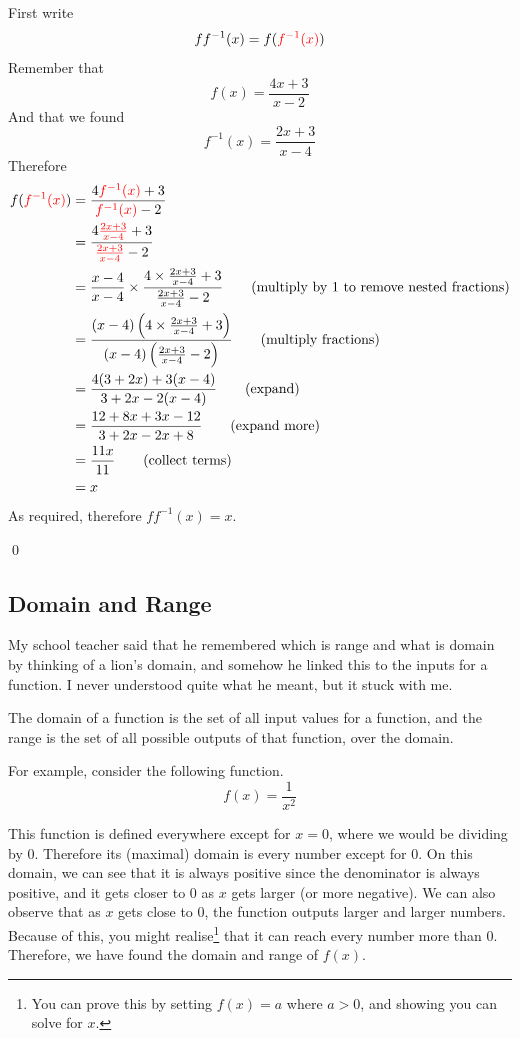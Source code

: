 \begin{solution}
\begin{enumerate}
        First write 
        \[ ff^{-1}(x) =  f(\textcolor{red}{f^{-1}(x)})\]
        Remember that 
        \[ f(x) = \frac{4x + 3}{x-2} \]
        And that we found 
        \[ f^{-1}(x) = \frac{2x+3}{x-4}\]
        Therefore 
        \begin{align*}
            f(\textcolor{red}{f^{-1}(x)}) &= \frac{4\textcolor{red}{f^{-1}(x)} + 3 }{\textcolor{red}{f^{-1}(x)} - 2} \\
                &= \frac{4\textcolor{red}{\frac{2x+3}{x-4}} + 3 }{\textcolor{red}{\frac{2x+3}{x-4}} - 2} \\ 
                &= \frac{x-4}{x-4} \times \frac{4\times \frac{2x+3}{x-4} + 3 }{\frac{2x+3}{x-4} - 2} \tag{multiply by $1$ to remove nested fractions} \\
                &= \frac{(x-4)\left(4\times \frac{2x+3}{x-4} + 3 \right)}{(x-4 )\left(\frac{2x+3}{x-4} - 2\right)} \tag{multiply fractions} \\
                &= \frac{4(3 + 2x) + 3(x-4)}{3+2x - 2(x-4)} \tag{expand} \\
                &= \frac{12 + 8x + 3x - 12}{3 + 2x - 2x + 8} \tag{expand more} \\
                &= \frac{11x}{11} \tag{collect terms}\\
                &= x
        \end{align*}
        As required, therefore $ff^{-1}(x) = x$.
    \end{enumerate}
    \qed
\end{solution}



\subsection{Domain and Range}

My school teacher said that he remembered which is range and what is domain by thinking of a lion's domain, and somehow he linked this to the inputs for a function. 
I never understood quite what he meant, but it stuck with me.

The domain of a function is the set of all input values for a function, and the range is the set of all possible outputs of that function, over the domain.

For example, consider the following function.
\[ f(x) = \frac{1}{x^2}\]

This function is defined everywhere except for $x=0$, where we would be dividing by $0$. Therefore its (maximal) domain is every number except for $0$. 
On this domain, we can see that it is always positive since the denominator is always positive, and it gets closer to $0$ as $x$ gets larger (or more negative). 
We can also observe that as $x$ gets close to $0$, the function outputs larger and larger numbers. Because of this, you might realise\footnote{You can prove this by setting $f(x) = a$ where $a>0$, and showing you can solve for $x$.} 
that it can reach every number more than $0$. Therefore, we have found the domain and range of $f(x)$.

